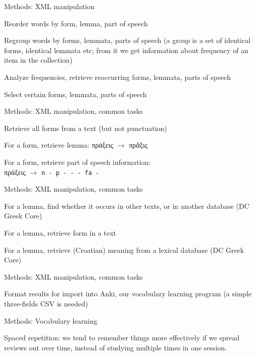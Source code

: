 \documentclass{beamer}
\begin{document}
\begin{frame}{Methods: XML manipulation}

\alert{Reorder} words by form, lemma, part of speech

\alert{Regroup} words by forms, lemmata, parts of speech (a group is a set of identical forms, identical lemmata etc; from it we get information about frequency of an item in the collection)

Analyze frequencies, retrieve reoccurring forms, lemmata, parts of speech

Select certain forms, lemmata, parts of speech

\end{frame}

\begin{frame}{Methods: XML manipulation, common tasks}

Retrieve all forms from a text (but not punctuation)

For a form, retrieve lemma: πράξεις $\rightarrow$ πρᾶξις

For a form, retrieve part of speech information: \\
πράξεις $\rightarrow$ \texttt{n - p - - - fa -}


\end{frame}

\begin{frame}{Methods: XML manipulation, common tasks}

For a lemma, find whether it occurs in other texts, or in another database (DC Greek Core)

For a lemma, retrieve form in a text

For a lemma, retrieve (Croatian) meaning from a lexical database (DC Greek Core)


\end{frame}



\begin{frame}{Methods: XML manipulation, common tasks}

Format results for import into Anki, our vocabulary learning program (a simple three-fields CSV is needed)

\end{frame}

\begin{frame}{Methods: Vocabulary learning}

\alert{Spaced repetition}: we tend to remember things more effectively if we spread reviews out over time, instead of studying multiple times in one session.

\end{frame}
\end{document}
